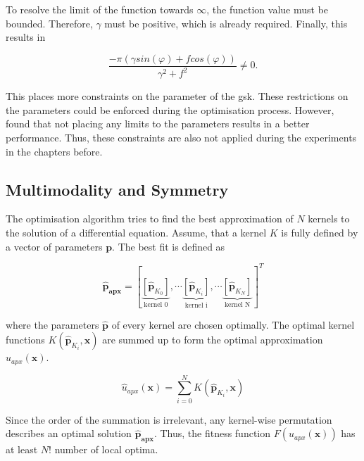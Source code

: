 \documentclass[./\jobname.tex]{subfiles}
\begin{document}
To resolve the limit of the function towards $\infty$, the function value must be bounded. Therefore, $\gamma$ must be positive, which is already required. Finally, this results in 

\begin{equation}
	\frac{-\pi (\gamma sin(\varphi) + f cos(\varphi))}{\gamma^2 + f^2} \neq 0.
\end{equation}

This places more constraints on the parameter of the \gls{gsk}. These restrictions on the parameters could be enforced during the optimisation process. However, \cite{chaquet_using_2019} found that not placing any limits to the parameters results in a better performance. Thus, these constraints are also not applied during the experiments in the chapters before. 

\subsection{Multimodality and Symmetry}
\label{chap:multimodality_and_symmetry}

The optimisation algorithm tries to find the best approximation of $N$ kernels to the solution of a differential equation. Assume, that a kernel $K$ is fully defined by a vector of parameters $\mathbf{p}$. The best fit is defined as 

\begin{equation}
\mathbf{\hat{p}_{apx}} = \left[\underbrace{\left[ \mathbf{\hat{p}}_{K_0} \right] }_{\text{kernel 0}}, \cdots \underbrace{\left[ \mathbf{\hat{p}}_{K_i} \right] }_{\text{kernel i}}, \cdots \underbrace{\left[ \mathbf{\hat{p}}_{K_N} \right]}_{\text{kernel N}} \right]^T
\end{equation}

where the parameters $\mathbf{\hat{p}}$ of every kernel are chosen optimally. The optimal kernel functions $K(\mathbf{\hat{p}}_{K_i}, \mathbf{x})$ are summed up to form the optimal approximation $\hat{u}_{apx}(\mathbf{x})$. 

\begin{equation}
\label{eq:uapx_kernel_sum}
\hat{u}_{apx}(\mathbf{x}) = \sum_{i=0}^{N} K(\mathbf{\hat{p}}_{K_i}, \mathbf{x})
\end{equation}

Since the order of the summation is irrelevant, any kernel-wise permutation describes an optimal solution $\mathbf{\hat{p}_{apx}}$. Thus, the fitness function $F(u_{apx}(\mathbf{x}))$ has at least $N!$ number of local optima. 
\end{document}
